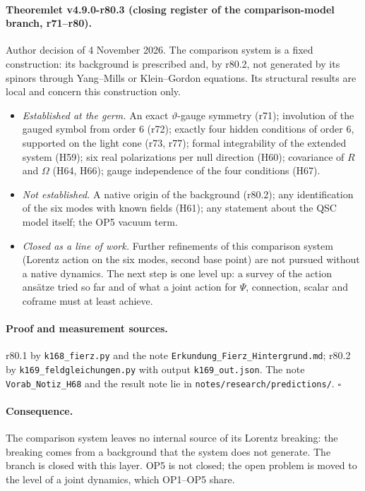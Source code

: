 \paragraph{Theoremlet v4.9.0-r80.3 (closing register of the comparison-model branch, r71--r80).}
Author decision of 4 November 2026.  The comparison system is a fixed construction: its background is prescribed and, by
r80.2, not generated by its spinors through Yang--Mills or Klein--Gordon equations.  Its structural results are local and
concern this construction only.
\begin{itemize}[leftmargin=2em]
\item \emph{Established at the germ.}  An exact \(\vartheta\)-gauge symmetry (r71); involution of the gauged symbol from order
6 (r72); exactly four hidden conditions of order 6, supported on the light cone (r73, r77); formal integrability of the
extended system (H59); six real polarizations per null direction (H60); covariance of \(R\) and \(\Omega\) (H64, H66); gauge
independence of the four conditions (H67).
\item \emph{Not established.}  A native origin of the background (r80.2); any identification of the six modes with known
fields (H61); any statement about the QSC model itself; the OP5 vacuum term.
\item \emph{Closed as a line of work.}  Further refinements of this comparison system (Lorentz action on the six modes, second
base point) are not pursued without a native dynamics.  The next step is one level up: a survey of the action ansätze tried
so far and of what a joint action for \(\Psi\), connection, scalar and coframe must at least achieve.
\end{itemize}

\paragraph{Proof and measurement sources.}
r80.1 by \texttt{k168\_fierz.py} and the note \texttt{Erkundung\_\allowbreak Fierz\_\allowbreak Hintergrund.md}; r80.2 by
\texttt{k169\_\allowbreak feldgleichungen.py} with output \texttt{k169\_out.json}.  The note \texttt{Vorab\_\allowbreak Notiz\_\allowbreak H68}
and the result note lie in \texttt{notes/\allowbreak research/\allowbreak predictions/}.  \(\square\)

\paragraph{Consequence.}
The comparison system leaves no internal source of its Lorentz breaking: the breaking comes from a background that the
system does not generate.  The branch is closed with this layer.  OP5 is not closed; the open problem is moved to the level
of a joint dynamics, which OP1--OP5 share.

